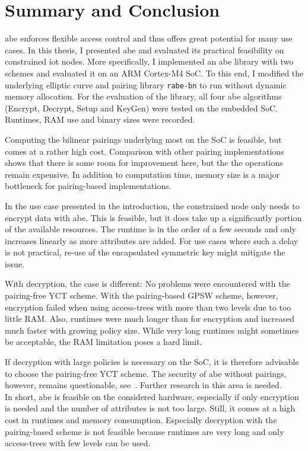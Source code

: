 \chapter{Summary and Conclusion}

\acrfull{abe} enforces flexible access control and thus offers great potential for many use cases.
In this thesis, I presented \acrshort{abe} and evaluated its practical feasibility on constrained \acrshort{iot} nodes.
More specifically, I implemented an \acrshort{abe} library with two schemes and evaluated it on an ARM Cortex-M4 SoC.
To this end, I modified the underlying elliptic curve and pairing library \texttt{rabe-bn} to run without dynamic memory allocation.
For the evaluation of the library, all four \acrshort{abe} algorithms (Encrypt, Decrypt, Setup and KeyGen) were tested on the embedded SoC.
Runtimes, RAM use and binary sizes were recorded.

Computing the bilinear pairings underlying most  on the SoC is feasible, but comes at a rather high cost.
Comparison with other pairing implementations shows that there is some room for improvement here, but the the operations remain expensive.
In addition to computation time, memory size is a major bottleneck for pairing-based implementations.

In the use case presented in the introduction, the constrained node only needs to encrypt data with \acrshort{abe}.
This is feasible, but it does take up a significantly portion of the available resources.
The runtime is in the order of a few seconds and only increases linearly as more attributes are added.
For use cases where such a delay is not practical, re-use of the encapsulated symmetric key might mitigate the issue.

With decryption, the case is different: 
No problems were encountered with the pairing-free YCT scheme.
With the pairing-based GPSW scheme, however, encryption failed when using \glspl{access-tree} with more than two levels due to too little RAM.
Also, runtimes were much longer than for encryption and increased much faster with growing policy size.
While very long runtimes might sometimes be acceptable, the RAM limitation poses a hard limit.

If decryption with large policies is necessary on the SoC, it is therefore advisable to choose the pairing-free YCT scheme.
The security of \acrshort{abe} without pairings, however, remains questionable, see~\cite{herranz_attacking_2020}.
Further research in this area is needed.\\

In short, \acrlong{abe} is feasible on the considered hardware, especially if only encryption is needed and the number of attributes is not too large.
Still, it comes at a high cost in runtimes and memory consumption.
Especially decryption with the pairing-based scheme is not feasible because runtimes are very long and only \glspl{access-tree} with few levels can be used.